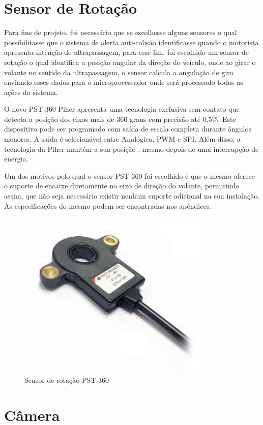 \section{Sensor de Rotação}

Para fins de projeto, foi necessário que se escolhesse alguns sensores o qual possibilitasse que o sistema de alerta anti-colisão identificasse quando o motorista apresenta intenção de ultrapassagem, para esse fim, foi escolhido um sensor de rotação o qual identifica a posição angular da direção do veículo, onde ao girar o volante no sentido da ultrapassagem, o sensor calcula a angulação de giro enviando esses dados para o microprocessador onde será processado todas as ações do sistema.

O novo PST-360 Piher apresenta uma tecnologia exclusiva sem contato que detecta a posição dos eixos mais de 360 graus com precisão até 0,5\%. Este dispositivo pode ser programado com saída de escala completa durante ângulos menores. A saída é selecionável entre Analógica, PWM e SPI. Além disso, a tecnologia da Piher mantém a sua posição , mesmo depois de uma interrupção de energia.

Um dos motivos pelo qual o sensor PST-360 foi escolhido é que o mesmo oferece o suporte de encaixe diretamente no eixo de direção do volante, permitindo assim, que não seja necessário existir nenhum suporte adicional na sua instalação. As especificações do mesmo podem ser encontradas nos apêndices.

\begin{figure}[h]
  \centering
  \includegraphics[width=350px, scale=1]{figuras/pst}
  \caption{Sensor de rotação PST-360}
\label{fig:pst}
\end{figure}


\section{Câmera}

